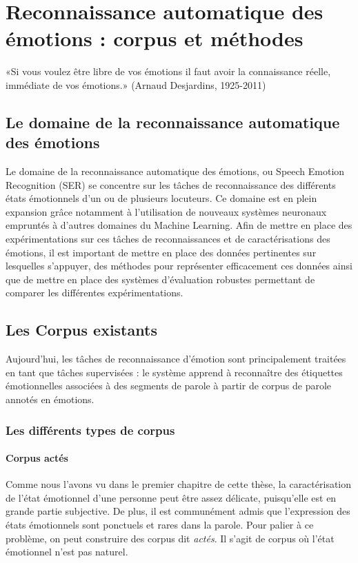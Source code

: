 \chapter{Reconnaissance automatique des émotions : corpus et méthodes}
\label{chapitre3}
«Si vous voulez être libre de vos émotions il faut avoir la connaissance réelle, immédiate de vos émotions.»  (Arnaud Desjardins, 1925-2011)


\section{Le domaine de la reconnaissance automatique des émotions}
Le domaine de la reconnaissance automatique des émotions, ou Speech Emotion Recognition (SER) se concentre sur les tâches de reconnaissance des différents états émotionnels d'un ou de plusieurs locuteurs. Ce domaine est en plein expansion grâce notamment à l'utilisation de nouveaux systèmes neuronaux empruntés à d'autres domaines du Machine Learning.
Afin de mettre en place des expérimentations sur ces tâches de reconnaissances et de caractérisations des émotions, il est important de mettre en place des données pertinentes sur lesquelles s'appuyer, des méthodes pour représenter efficacement ces données ainsi que de mettre en place des systèmes d'évaluation robustes permettant de comparer les différentes expérimentations.

\section{Les Corpus existants}
Aujourd'hui, les tâches de reconnaissance d'émotion sont principalement traitées en tant que tâches supervisées : le système apprend à reconnaître des étiquettes émotionnelles associées à des segments de parole à partir de corpus de parole annotés en émotions.

\subsection{Les différents types de corpus}
\subsubsection{Corpus actés}
Comme nous l'avons vu dans le premier chapitre de cette thèse, la caractérisation de l'état émotionnel d'une personne peut être assez délicate, puisqu'elle est en grande partie subjective. De plus, il est communément admis que l'expression des états émotionnels sont ponctuels et rares dans la parole. Pour palier à ce problème, on peut construire des corpus dit \textit{actés}. Il s'agit de corpus où l'état émotionnel n'est pas naturel.

